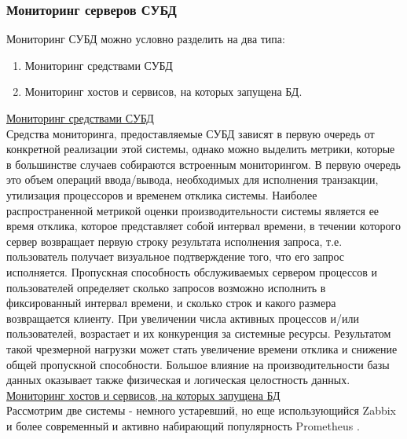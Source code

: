 \subsubsection{Мониторинг серверов СУБД}
Мониторинг СУБД можно условно разделить на два типа:
\begin{enumerate}
    \item Мониторинг средствами СУБД
    \item Мониторинг хостов и сервисов, на которых запущена БД.
\end{enumerate}
\underline{Мониторинг средствами СУБД} \\ Средства мониторинга, предоставляемые СУБД зависят в первую очередь от конкретной реализации этой системы, однако можно выделить метрики, которые в большинстве случаев собираются встроенным мониторингом. В первую очередь это объем операций ввода/вывода, необходимых для исполнения транзакции, утилизация процессоров и временем отклика системы. Наиболее распространенной метрикой оценки производительности системы является ее время отклика, которое представляет собой интервал времени, в течении которого сервер возвращает первую строку результата исполнения запроса, т.е. пользователь получает визуальное подтверждение того, что его запрос исполняется. Пропускная способность обслуживаемых сервером процессов и пользователей определяет сколько запросов возможно исполнить в фиксированный интервал времени, и сколько строк и какого размера возвращается клиенту. При увеличении числа активных процессов и/или пользователей, возрастает и их конкуренция за системные ресурсы. Результатом такой чрезмерной нагрузки может стать увеличение времени отклика и снижение общей пропускной способности. Большое влияние на производительности базы данных оказывает также физическая и логическая целостность данных. \\
\underline{Мониторинг хостов и сервисов, на которых запущена БД} \\ Рассмотрим две системы - немного устаревший, но еще использующийся Zabbix и более современный и активно набирающий популярность Prometheus \autocite{Prometheus-vs-Zabbix}.
